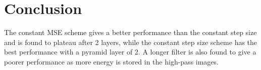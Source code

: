 \section*{Conclusion}

The constant MSE scheme gives a better performance than the constant step size and is found to plateau after 2 layers, while the constant step size scheme has the best performance with a pyramid layer of 2. A longer filter is also found to give a poorer performance as more energy is stored in the high-pass images.
